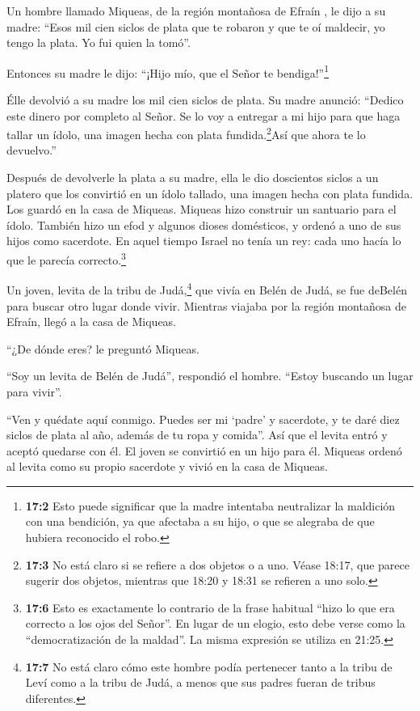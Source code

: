  Un hombre llamado Miqueas, de la región montañosa de Efraín
 , le dijo a su madre: ``Esos mil cien siclos de plata que
te robaron y que te oí maldecir, yo tengo la plata. Yo fui quien la
tomó''.

Entonces su madre le dijo: ``¡Hijo mío, que el Señor te
bendiga!''\footnote{\textbf{17:2} Esto puede significar que la madre
  intentaba neutralizar la maldición con una bendición, ya que afectaba
  a su hijo, o que se alegraba de que hubiera reconocido el robo.}

 Élle devolvió a su madre los mil cien siclos de plata. Su
madre anunció: ``Dedico este dinero por completo al Señor. Se lo voy a
entregar a mi hijo para que haga tallar un ídolo, una imagen hecha con
plata fundida.\footnote{\textbf{17:3} No está claro si se refiere a dos
  objetos o a uno. Véase 18:17, que parece sugerir dos objetos, mientras
  que 18:20 y 18:31 se refieren a uno solo.}Así que ahora te lo
devuelvo.''

 Después de devolverle la plata a su madre, ella le dio
doscientos siclos a un platero que los convirtió en un ídolo tallado,
una imagen hecha con plata fundida. Los guardó en la casa de Miqueas.
 Miqueas hizo construir un santuario para el ídolo. También
hizo un efod y algunos dioses domésticos, y ordenó a uno de sus hijos
como sacerdote.  En aquel tiempo Israel no tenía un rey:
cada uno hacía lo que le parecía correcto.\footnote{\textbf{17:6} Esto
  es exactamente lo contrario de la frase habitual ``hizo lo que era
  correcto a los ojos del Señor''. En lugar de un elogio, esto debe
  verse como la ``democratización de la maldad''. La misma expresión se
  utiliza en 21:25.}

 Un joven, levita de la tribu de Judá,\footnote{\textbf{17:7}
  No está claro cómo este hombre podía pertenecer tanto a la tribu de
  Leví como a la tribu de Judá, a menos que sus padres fueran de tribus
  diferentes.} que vivía en Belén de Judá,  se fue deBelén
para buscar otro lugar donde vivir. Mientras viajaba por la región
montañosa de Efraín, llegó a la casa de Miqueas.

 ``¿De dónde eres? le preguntó Miqueas.

``Soy un levita de Belén de Judá'', respondió el hombre. ``Estoy
buscando un lugar para vivir''.

 ``Ven y quédate aquí conmigo. Puedes ser mi `padre' y
sacerdote, y te daré diez siclos de plata al año, además de tu ropa y
comida''. Así que el levita entró  y aceptó quedarse con
él. El joven se convirtió en un hijo para él.  Miqueas
ordenó al levita como su propio sacerdote y vivió en la casa de Miqueas.

